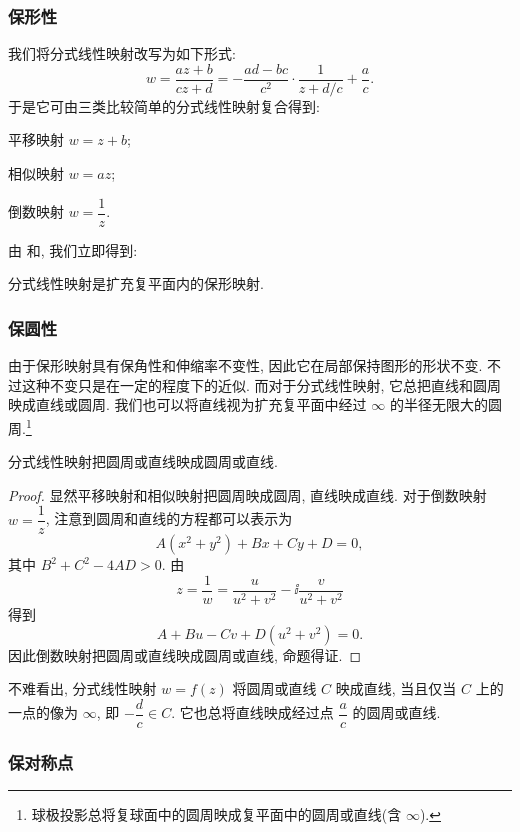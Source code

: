 \subsubsection{保形性}

我们将分式线性映射改写为如下形式:
\[
   w
  =\frac{az+b}{cz+d}
  =-\frac{ad-bc}{c^2}\cdot\frac1{z+d/c}+\frac ac.
\]
于是它可由三类比较简单的分式线性映射复合得到:
\begin{enuma}
  \item 平移映射 $w=z+b$;
  \item 相似映射 $w=az$;\smallskip
  \item 倒数映射 $w=\dfrac1z$.
\end{enuma}
\smallskip
由 和, 我们立即得到:

\begin{theorem}
  分式线性映射是扩充复平面内的保形映射.
\end{theorem}


\subsubsection{保圆性}

由于保形映射具有保角性和伸缩率不变性, 因此它在局部保持图形的形状不变.
不过这种不变只是在一定的程度下的近似.
而对于分式线性映射, 它总把直线和圆周映成直线或圆周.
我们也可以将直线视为扩充复平面中经过 $\infty$ 的半径无限大的圆周.\footnote{
  球极投影总将复球面中的圆周映成复平面中的圆周或直线(含 $\infty$).
}

\begin{theorem}
  分式线性映射把圆周或直线映成圆周或直线.
\end{theorem}

\begin{proof}
  显然平移映射和相似映射把圆周映成圆周, 直线映成直线.
  对于倒数映射 $w=\dfrac1z$, 注意到圆周和直线的方程都可以表示为
  \[
    A(x^2+y^2)+Bx+Cy+D=0,
  \]
  其中 $B^2+C^2-4AD>0$. 由
  \[
      z
    =\frac1w
    =\frac{u}{u^2+v^2}-\ii \frac{v}{u^2+v^2}
  \]
  得到
  \[
    A+Bu-Cv+D(u^2+v^2)=0.
  \]
  因此倒数映射把圆周或直线映成圆周或直线, 命题得证.
\end{proof}

不难看出, 分式线性映射 $w=f(z)$ 将圆周或直线 $C$ 映成直线, 当且仅当 $C$ 上的一点的像为 $\infty$, 即 $-\dfrac dc\in C$.
它也总将直线映成经过点 $\dfrac ac$ 的圆周或直线.


\subsubsection{保对称点}

